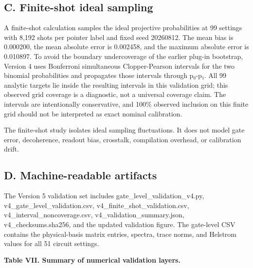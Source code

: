 \documentclass[
]{article}
\begin{document}
\subsection{C. Finite-shot ideal
sampling}\label{c.-finite-shot-ideal-sampling}

A finite-shot calculation samples the ideal projective probabilities at
99 settings with 8,192 shots per pointer label and fixed seed 20260812.
The mean bias is 0.000200, the mean absolute error is 0.002458, and the
maximum absolute error is 0.010897. To avoid the boundary undercoverage
of the earlier plug-in bootstrap, Version 4 uses Bonferroni simultaneous
Clopper-Pearson intervals for the two binomial probabilities and
propagates those intervals through \textbar p₀-p₁\textbar. All 99
analytic targets lie inside the resulting intervals in this validation
grid; this observed grid coverage is a diagnostic, not a universal
coverage claim. The intervals are intentionally conservative, and 100\%
observed inclusion on this finite grid should not be interpreted as
exact nominal calibration.

The finite-shot study isolates ideal sampling fluctuations. It does not
model gate error, decoherence, readout bias, crosstalk, compilation
overhead, or calibration drift.

\subsection{D. Machine-readable
artifacts}\label{d.-machine-readable-artifacts}

The Version 5 validation set includes gate\_level\_validation\_v4.py,
v4\_gate\_level\_validation.csv, v4\_finite\_shot\_validation.csv,
v4\_interval\_noncoverage.csv, v4\_validation\_summary.json,
v4\_checksums.sha256, and the updated validation figure. The gate-level
CSV contains the physical-basis matrix entries, spectra, trace norms,
and Helstrom values for all 51 circuit settings.

\textbf{Table VII. Summary of numerical validation layers.}
\end{document}
